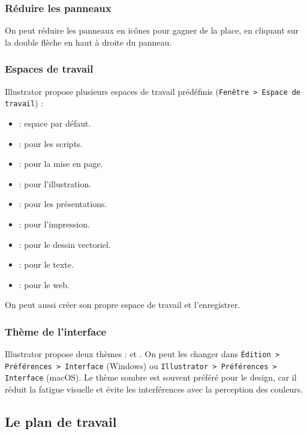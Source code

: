 \subsubsection{Réduire les panneaux}

On peut réduire les panneaux en icônes pour gagner de la place, en cliquant sur la double flèche en haut à droite du panneau.

\subsubsection{Espaces de travail}

Illustrator propose plusieurs espaces de travail prédéfinis (\texttt{Fenêtre > Espace de travail}) :

\begin{itemize}
    \item {} : espace par défaut.
    \item {} : pour les scripts.
    \item {} : pour la mise en page.
    \item {} : pour l'illustration.
    \item {} : pour les présentations.
    \item {} : pour l'impression.
    \item {} : pour le dessin vectoriel.
    \item {} : pour le texte.
    \item {} : pour le web.
\end{itemize}

On peut aussi créer son propre espace de travail et l'enregistrer.

\subsubsection{Thème de l'interface}

Illustrator propose deux thèmes :  et . On peut les changer dans \texttt{Édition > Préférences > Interface} (Windows) ou \texttt{Illustrator > Préférences > Interface} (macOS). Le thème sombre est souvent préféré pour le design, car il réduit la fatigue visuelle et évite les interférences avec la perception des couleurs.

\subsection{Le plan de travail}

